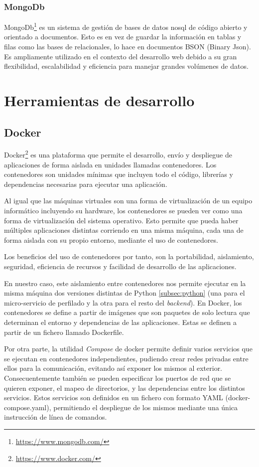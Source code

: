 \subsubsection{MongoDb}
MongoDb\footnote{\url{https://www.mongodb.com/}} es un sistema de gestión de bases de datos \acrfull{nosql} de código abierto y orientado a documentos. Esto es en vez de guardar la información en tablas y filas como las bases de relacionales, lo hace en documentos BSON (Binary Json). Es ampliamente utilizado en el contexto del desarrollo web debido a su gran flexibilidad, escalabilidad y eficiencia para manejar grandes volúmenes de datos.
\section{Herramientas de desarrollo}
\subsection{Docker}
Docker\footnote{\url{https://www.docker.com/}} es una plataforma que permite el desarrollo, envío y despliegue de aplicaciones de forma aislada en unidades llamadas contenedores. Los contenedores son unidades mínimas que incluyen todo el código, librerías y dependencias necesarias para ejecutar una aplicación.

Al igual que las máquinas virtuales son una forma de virtualización de un equipo informático incluyendo su hardware, los contenedores se pueden ver como una forma de virtualización del sistema operativo. Esto permite que pueda haber múltiples aplicaciones distintas corriendo en una misma máquina, cada una de forma aislada con su propio entorno, mediante el uso de contenedores.

Los beneficios del uso de contenedores por tanto, son la portabilidad, aislamiento, seguridad, eficiencia de recursos y facilidad de desarrollo de las aplicaciones.

En nuestro caso, este aislamiento entre contenedores nos permite ejecutar en la misma máquina dos versiones distintas de Python \ref{subsec:python} (una para el micro-servicio de perfilado y la otra para el resto del \textit{backend}).
En Docker, los contenedores se define a partir de imágenes que son paquetes de solo lectura que determinan el entorno y dependencias de las aplicaciones. Estas se definen a partir de un fichero llamado Dockerfile.

Por otra parte, la utilidad \textit{Compose} de docker permite definir varios servicios que se ejecutan en contenedores independientes, pudiendo crear redes privadas entre ellos para la comunicación, evitando así exponer los mismos al exterior. Consecuentemente también se pueden especificar los puertos de red que se quieren exponer, el mapeo de directorios, y las dependencias entre los distintos servicios. Estos servicios son definidos en un fichero con formato YAML (docker-compose.yaml), permitiendo el despliegue de los mismos mediante una única instrucción de línea de comandos.


